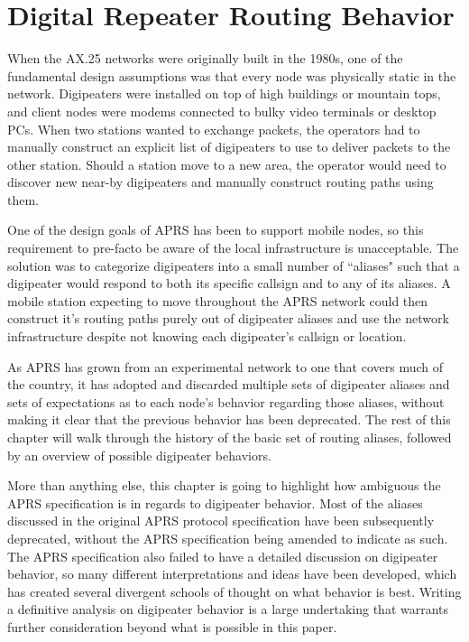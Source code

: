 \chapter{Digital Repeater Routing Behavior}

When the AX.25 networks were originally built in the 1980s,
one of the fundamental design assumptions was that every node was 
physically static in the network.
Digipeaters were installed on top of high buildings or mountain tops, 
and client nodes were modems connected to bulky video terminals or desktop PCs.
When two stations wanted to exchange packets,
the operators had to manually construct an explicit list of digipeaters to use
to deliver packets to the other station.
Should a station move to a new area, 
the operator would need to discover new near-by digipeaters and manually construct
routing paths using them.

One of the design goals of APRS has been to support mobile nodes,
so this requirement to pre-facto be aware of the
local infrastructure is unacceptable.
The solution was to categorize digipeaters into a small number of ``aliases"
such that a digipeater would respond to both its specific callsign
and to any of its aliases.
A mobile station expecting to move throughout the APRS network
could then construct it's routing paths purely out of digipeater aliases
and use the network infrastructure despite not knowing
each digipeater's callsign or location.

As APRS has grown from an experimental network
to one that covers much of the country,
it has adopted and discarded multiple sets of digipeater aliases
and sets of expectations as to each node's behavior regarding those aliases,
without making it clear that the previous behavior has been deprecated.
The rest of this chapter will walk through the history
of the basic set of routing aliases,
followed by an overview of possible digipeater behaviors.

More than anything else, this chapter is going to highlight
how ambiguous the APRS specification is in regards to digipeater behavior.
Most of the aliases discussed in the original APRS protocol specification
have been subsequently deprecated,
without the APRS specification being amended to indicate as such.
The APRS specification also failed to have a detailed discussion
on digipeater behavior,
so many different interpretations and ideas have been developed, which has
created several divergent schools of thought on what behavior is best.
Writing a definitive analysis on digipeater behavior is a large undertaking
that warrants further consideration beyond what is possible in this paper.


